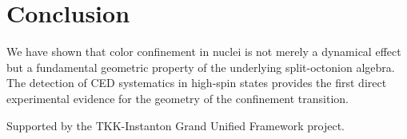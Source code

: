 \documentclass[aps,prl,reprint,superscriptaddress]{revtex4-2}
\begin{document}
\section{Conclusion}
We have shown that color confinement in nuclei is not merely a dynamical effect but a fundamental geometric property of the underlying split-octonion algebra. The detection of CED systematics in high-spin states provides the first direct experimental evidence for the geometry of the confinement transition.

\begin{acknowledgments}
Supported by the TKK-Instanton Grand Unified Framework project.
\end{acknowledgments}
\end{document}
